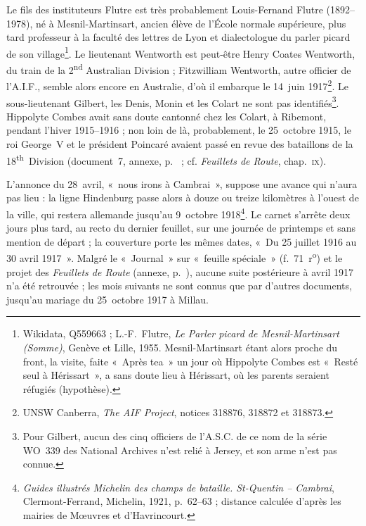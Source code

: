Le fils des instituteurs Flutre est très probablement Louis-Fernand Flutre (1892--1978), né à Mesnil-Martinsart, ancien élève de l'École normale supérieure, plus tard professeur à la faculté des lettres de Lyon et dialectologue du parler picard de son village\footnote{Wikidata, Q559663 ; L.-F.~Flutre, \textit{Le Parler picard de Mesnil-Martinsart (Somme)}, Genève et Lille, 1955. Mesnil-Martinsart étant alors proche du front, la visite, faite «~Après tea~» un jour où Hippolyte Combes est «~Resté seul à Hérissart~», a sans doute lieu à Hérissart, où les parents seraient réfugiés (hypothèse).}. Le lieutenant Wentworth est peut-être Henry Coates Wentworth, du train de la 2\textsuperscript{nd} Australian Division ; Fitzwilliam Wentworth, autre officier de l'A.I.F., semble alors encore en Australie, d'où il embarque le 14~juin 1917\footnote{UNSW Canberra, \textit{The AIF Project}, notices 318876, 318872 et 318873.}. Le sous-lieutenant Gilbert, les Denis, Monin et les Colart ne sont pas identifiés\footnote{Pour Gilbert, aucun des cinq officiers de l'A.S.C. de ce nom de la série WO~339 des National Archives n'est relié à Jersey, et son arme n'est pas connue.}. Hippolyte Combes avait sans doute cantonné chez les Colart, à Ribemont, pendant l'hiver 1915--1916 ; non loin de là, probablement, le 25~octobre 1915, le roi George~V et le président Poincaré avaient passé en revue des bataillons de la 18\textsuperscript{th}~Division (document~7, annexe, p.~\pageref{annexe:doc7} ; cf. \textit{Feuillets de Route}, chap.~\textsc{ix}).

L'annonce du 28~avril, «~nous irons à Cambrai~», suppose une avance qui n'aura pas lieu : la ligne Hindenburg passe alors à douze ou treize kilomètres à l'ouest de la ville, qui restera allemande jusqu'au 9~octobre 1918\footnote{\textit{Guides illustrés Michelin des champs de bataille. St-Quentin -- Cambrai}, Clermont-Ferrand, Michelin, 1921, p.~62--63 ; distance calculée d'après les mairies de Mœuvres et d'Havrincourt.}. Le carnet s'arrête deux jours plus tard, au recto du dernier feuillet, sur une journée de printemps et sans mention de départ ; la couverture porte les mêmes dates, «~Du 25 juillet 1916 au 30 avril 1917~». Malgré le «~Journal~» sur «~feuille spéciale~» (f.~71~r\textsuperscript{o}) et le projet des \textit{Feuillets de Route} (annexe, p.~\pageref{annexe:doc6}), aucune suite postérieure à avril 1917 n'a été retrouvée ; les mois suivants ne sont connus que par d'autres documents, jusqu'au mariage du 25~octobre 1917 à Millau.
